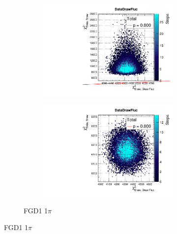 \begin{figure}[h]
\begin{subfigure}[t]{\textwidth}
\begin{subfigure}[t]{0.24\textwidth}
			\includegraphics[width=\textwidth, trim={0mm 0mm 0mm 8mm}, clip,page=20]{figures/mach3/2018/data/2018a_FixedCov_RedCov_Mpi_Data_merge_PriorPred_procs}
		\end{subfigure}
		\begin{subfigure}[t]{0.24\textwidth}
			\includegraphics[width=\textwidth, trim={0mm 0mm 0mm 8mm}, clip,page=20]{figures/mach3/2018/data/2018a_FixedCov_RedCov_Mpi_Data_merge_PostPredStore_FullLLH_procs}
		\end{subfigure}
		\caption{FGD1 1$\pi$}
	\end{subfigure}
	

\end{figure}

